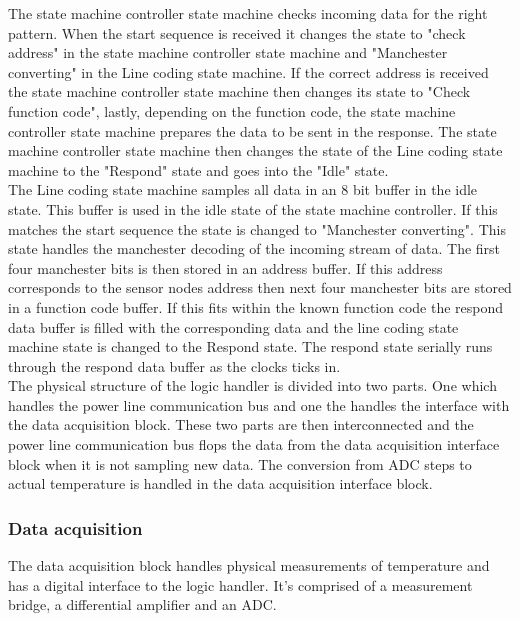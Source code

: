 The state machine controller state machine checks incoming data for the right pattern. When the start sequence is received it changes the state to "check address" in the state machine controller state machine and "Manchester converting" in the Line coding state machine. If the correct address is received the state machine controller state machine then changes its state to "Check function code", lastly, depending on the function code, the state machine controller state machine prepares the data to be sent in the response. The state machine controller state machine then changes the state of the Line coding state machine to the "Respond" state and goes into the "Idle" state.\\
The Line coding state machine samples all data in an 8 bit buffer in the idle state. This buffer is used in the idle state of the state machine controller. If this matches the start sequence the state is changed to "Manchester converting". This state handles the manchester decoding of the incoming stream of data. The first four manchester bits is then stored in an address buffer. If this address corresponds to the sensor nodes address then next four manchester bits are stored in a function code buffer. If this fits within the known function code the respond data buffer is filled with the corresponding data and the line coding state machine state is changed to the Respond state. The respond state serially runs through the respond data buffer as the clocks ticks in.\\

The physical structure of the logic handler is divided into two parts. One which handles the power line communication bus and one the handles the interface with the data acquisition block. These two parts are then interconnected and the power line communication bus flops the data from the data acquisition interface block when it is not sampling new data. The conversion from ADC steps to actual temperature is handled in the data acquisition interface block.

\subsubsection{Data acquisition}

The data acquisition block handles physical measurements of temperature and has a digital interface to the logic handler. It's comprised of a measurement bridge, a differential amplifier and an ADC.

